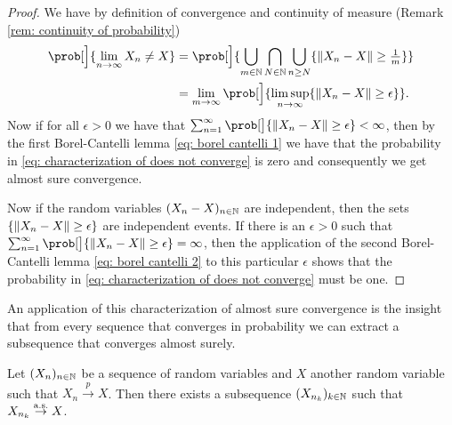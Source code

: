 \begin{proof}
    We have by definition of convergence and continuity of measure (Remark \ref{rem: continuity of probability})
    \begin{equation}
    \label{eq: characterization of does not converge}    
    \begin{aligned}[b]
        \prob[\Big]{\lim_{n\to\infty} X_n \neq X}
        &= \prob[\Big]{ \bigcup_{m \in \nat} \bigcap_{N\in \nat}\bigcup_{n \ge N} \set{\norm{X_n - X} \ge \tfrac1m} }
        \\
        &= \lim_{m\to \infty} \prob[\Big]{ \limsup_{n\to \infty} \{\norm{X_n - X} \ge \epsilon\} }.
    \end{aligned}
    \end{equation}
    Now if for all \(\epsilon > 0\) we have that \(\sum_{n=1}^\infty \prob[\big]{\norm{X_n - X} \ge \epsilon} < \infty\),
    then by the first Borel-Cantelli lemma \eqref{eq: borel cantelli 1}
    we have that the probability in \eqref{eq: characterization of does not converge} is zero
    and consequently we get almost sure convergence.

    Now if the random variables \((X_n - X)_{n\in \mathbb{N}}\) are independent, then
    the sets \(\{\lVert X_n - X\rVert \ge \epsilon\}\) are independent events. If there is an
    \(\epsilon > 0\) such that \(\sum_{n=1}^\infty \prob[\big]{\norm{X_n - X} \ge \epsilon} = \infty\),
    then the application of the second Borel-Cantelli lemma \eqref{eq: borel
    cantelli 2} to this particular \(\epsilon\) shows that the probability
    in \eqref{eq: characterization of does not converge} must be one.
\end{proof}

An application of this characterization of almost sure convergence is the
insight that from every sequence that converges in probability we can extract
a subsequence that converges almost surely.

\begin{lemma}
    \label{lem: subsequences converge almost surely}
    Let \((X_n)_{n\in \mathbb{N}}\) be a sequence of random variables and \(X\)
    another random variable such that \(X_n \overset{p}\to X\).
    Then there exists a subsequence \((X_{n_k})_{k\in \mathbb{N}}\)
    such that \(X_{n_k} \overset{\operatorname{\text{a.s.}}}\to X\).
\end{lemma}


